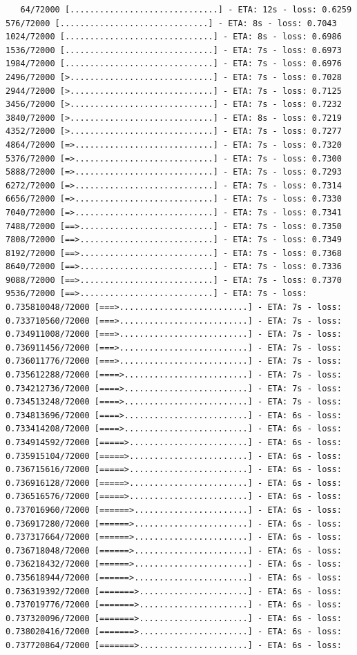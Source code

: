 \documentclass[12pt,fleqn]{article}\usepackage{../../common}
\begin{document}
\begin{verbatim}
   64/72000 [..............................] - ETA: 12s - loss: 0.6259  576/72000 [..............................] - ETA: 8s - loss: 0.7043  1024/72000 [..............................] - ETA: 8s - loss: 0.6986 1536/72000 [..............................] - ETA: 7s - loss: 0.6973 1984/72000 [..............................] - ETA: 7s - loss: 0.6976 2496/72000 [>.............................] - ETA: 7s - loss: 0.7028 2944/72000 [>.............................] - ETA: 7s - loss: 0.7125 3456/72000 [>.............................] - ETA: 7s - loss: 0.7232 3840/72000 [>.............................] - ETA: 8s - loss: 0.7219 4352/72000 [>.............................] - ETA: 7s - loss: 0.7277 4864/72000 [=>............................] - ETA: 7s - loss: 0.7320 5376/72000 [=>............................] - ETA: 7s - loss: 0.7300 5888/72000 [=>............................] - ETA: 7s - loss: 0.7293 6272/72000 [=>............................] - ETA: 7s - loss: 0.7314 6656/72000 [=>............................] - ETA: 7s - loss: 0.7330 7040/72000 [=>............................] - ETA: 7s - loss: 0.7341 7488/72000 [==>...........................] - ETA: 7s - loss: 0.7350 7808/72000 [==>...........................] - ETA: 7s - loss: 0.7349 8192/72000 [==>...........................] - ETA: 7s - loss: 0.7368 8640/72000 [==>...........................] - ETA: 7s - loss: 0.7336 9088/72000 [==>...........................] - ETA: 7s - loss: 0.7370 9536/72000 [==>...........................] - ETA: 7s - loss: 0.735810048/72000 [===>..........................] - ETA: 7s - loss: 0.733710560/72000 [===>..........................] - ETA: 7s - loss: 0.734911008/72000 [===>..........................] - ETA: 7s - loss: 0.736911456/72000 [===>..........................] - ETA: 7s - loss: 0.736011776/72000 [===>..........................] - ETA: 7s - loss: 0.735612288/72000 [====>.........................] - ETA: 7s - loss: 0.734212736/72000 [====>.........................] - ETA: 7s - loss: 0.734513248/72000 [====>.........................] - ETA: 7s - loss: 0.734813696/72000 [====>.........................] - ETA: 6s - loss: 0.733414208/72000 [====>.........................] - ETA: 6s - loss: 0.734914592/72000 [=====>........................] - ETA: 6s - loss: 0.735915104/72000 [=====>........................] - ETA: 6s - loss: 0.736715616/72000 [=====>........................] - ETA: 6s - loss: 0.736916128/72000 [=====>........................] - ETA: 6s - loss: 0.736516576/72000 [=====>........................] - ETA: 6s - loss: 0.737016960/72000 [======>.......................] - ETA: 6s - loss: 0.736917280/72000 [======>.......................] - ETA: 6s - loss: 0.737317664/72000 [======>.......................] - ETA: 6s - loss: 0.736718048/72000 [======>.......................] - ETA: 6s - loss: 0.736218432/72000 [======>.......................] - ETA: 6s - loss: 0.735618944/72000 [======>.......................] - ETA: 6s - loss: 0.736319392/72000 [=======>......................] - ETA: 6s - loss: 0.737019776/72000 [=======>......................] - ETA: 6s - loss: 0.737320096/72000 [=======>......................] - ETA: 6s - loss: 0.738020416/72000 [=======>......................] - ETA: 6s - loss: 0.737720864/72000 [=======>......................] - ETA: 6s - loss: 
\end{verbatim}
\end{document}
